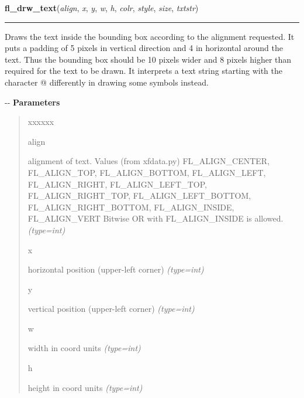 \hspace{.8\funcindent}\begin{boxedminipage}{\funcwidth}

    \raggedright \textbf{fl\_drw\_text}(\textit{align}, \textit{x}, \textit{y}, \textit{w}, \textit{h}, \textit{colr}, \textit{style}, \textit{size}, \textit{txtstr})

    \vspace{-1.5ex}

    \rule{\textwidth}{0.5\fboxrule}
\setlength{\parskip}{2ex}

Draws the text inside the bounding box according to the alignment
requested. It puts a padding of 5 pixels in vertical direction and 4 in
horizontal around the text. Thus the bounding box should be 10 pixels wider
and 8 pixels higher than required for the text to be drawn. It interprets
a text string starting with the character @ differently in drawing some
symbols instead.

-{}-
\setlength{\parskip}{1ex}
      \textbf{Parameters}
      \vspace{-1ex}

      \begin{quote}
        \begin{Ventry}{xxxxxx}

          \item[align]


alignment of text. Values (from xfdata.py) FL\_ALIGN\_CENTER,
FL\_ALIGN\_TOP, FL\_ALIGN\_BOTTOM, FL\_ALIGN\_LEFT, FL\_ALIGN\_RIGHT,
FL\_ALIGN\_LEFT\_TOP, FL\_ALIGN\_RIGHT\_TOP, FL\_ALIGN\_LEFT\_BOTTOM,
FL\_ALIGN\_RIGHT\_BOTTOM, FL\_ALIGN\_INSIDE, FL\_ALIGN\_VERT
Bitwise OR with FL\_ALIGN\_INSIDE is allowed.
            {\it (type=int)}

          \item[x]


horizontal position (upper-left corner)
            {\it (type=int)}

          \item[y]


vertical position (upper-left corner)
            {\it (type=int)}

          \item[w]


width in coord units
            {\it (type=int)}

          \item[h]


height in coord units
            {\it (type=int)}


\end{Ventry}
\end{quote}
\end{boxedminipage}

